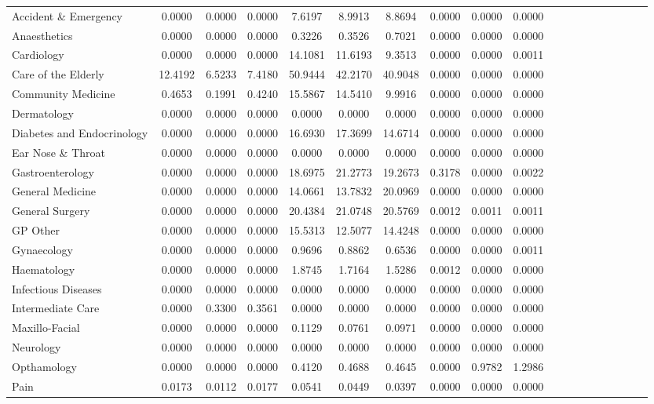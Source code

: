 \documentclass[thesis.tex]{subfiles}
\begin{document}
\begin{landscape}
\begin{table}[h!]
{\begin{tabular}{lcccccccccccccccccc}
Accident \& Emergency&	0.0000&	0.0000&	0.0000&	7.6197&	8.9913	&8.8694&	0.0000&	0.0000&	0.0000\\
Anaesthetics&	0.0000&	0.0000&	0.0000&	0.3226&	0.3526&	0.7021&	0.0000&	0.0000&	0.0000\\
Cardiology&	0.0000&	0.0000&	0.0000&	14.1081&	11.6193&	9.3513&	0.0000&	0.0000&	0.0011\\
Care of the Elderly&	12.4192	&6.5233&	7.4180&	50.9444&	42.2170&	40.9048&	0.0000&	0.0000&	0.0000\\
Community Medicine	&0.4653&	0.1991&	0.4240&	15.5867&	14.5410&	9.9916&	0.0000&	0.0000&	0.0000\\
Dermatology&	0.0000&	0.0000&	0.0000&	0.0000&	0.0000&	0.0000&	0.0000&	0.0000&	0.0000\\
Diabetes and Endocrinology&	0.0000&	0.0000&	0.0000&	16.6930&	17.3699	&14.6714&	0.0000&	0.0000&	0.0000\\
Ear Nose \& Throat&	0.0000	&0.0000&	0.0000&	0.0000&	0.0000&	0.0000&	0.0000&	0.0000&	0.0000\\
Gastroenterology&	0.0000&	0.0000&	0.0000&	18.6975&	21.2773&	19.2673&	0.3178&	0.0000&	0.0022\\
General Medicine	&0.0000&	0.0000&	0.0000&	14.0661&	13.7832&	20.0969&	0.0000&	0.0000&	0.0000\\
General Surgery	&0.0000&	0.0000&	0.0000&	20.4384&	21.0748&	20.5769&	0.0012&	0.0011&	0.0011\\
GP Other	&0.0000&	0.0000&	0.0000&	15.5313&	12.5077&	14.4248&	0.0000&	0.0000&	0.0000\\
Gynaecology&	0.0000&	0.0000&	0.0000&	0.9696&	0.8862&	0.6536&	0.0000&	0.0000&	0.0011\\
Haematology&	0.0000&	0.0000&	0.0000&	1.8745&	1.7164&	1.5286&	0.0012&	0.0000&	0.0000\\
Infectious Diseases	&0.0000&	0.0000&	0.0000&	0.0000&	0.0000&	0.0000&	0.0000&	0.0000&	0.0000\\
Intermediate Care	&0.0000&	0.3300&	0.3561&	0.0000&	0.0000&	0.0000&	0.0000&	0.0000&	0.0000\\
Maxillo-Facial&	0.0000&	0.0000&	0.0000&	0.1129&	0.0761	&0.0971&	0.0000&	0.0000&	0.0000\\
Neurology&	0.0000&	0.0000&	0.0000&	0.0000&	0.0000&	0.0000&	0.0000&	0.0000&	0.0000\\
Opthamology&	0.0000&	0.0000&	0.0000&	0.4120&	0.4688&	0.4645&	0.0000&	0.9782&	1.2986\\
Pain&	0.0173&	0.0112&	0.0177&	0.0541&	0.0449&	0.0397&	0.0000&	0.0000&	0.0000\\

\end{tabular}}
\end{table}
\end{landscape}
\end{document}

